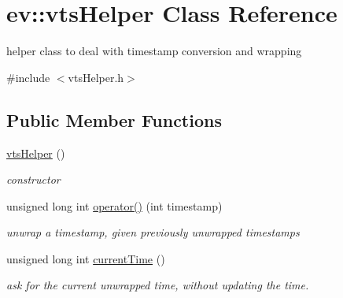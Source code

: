 \hypertarget{classev_1_1vtsHelper}{}\section{ev\+:\+:vts\+Helper Class Reference}
\label{classev_1_1vtsHelper}


helper class to deal with timestamp conversion and wrapping  




{\ttfamily \#include $<$vts\+Helper.\+h$>$}

\subsection*{Public Member Functions}
\begin{DoxyCompactItemize}
\item 
\hyperlink{classev_1_1vtsHelper_a44b5e8174eb7a317001e395bf0d917e8}{vts\+Helper} ()\hypertarget{classev_1_1vtsHelper_a44b5e8174eb7a317001e395bf0d917e8}{}\label{classev_1_1vtsHelper_a44b5e8174eb7a317001e395bf0d917e8}

\begin{DoxyCompactList}\small\item\em constructor \end{DoxyCompactList}\item 
unsigned long int \hyperlink{classev_1_1vtsHelper_a399c3a719f7544209ba77f442c97c135}{operator()} (int timestamp)\hypertarget{classev_1_1vtsHelper_a399c3a719f7544209ba77f442c97c135}{}\label{classev_1_1vtsHelper_a399c3a719f7544209ba77f442c97c135}

\begin{DoxyCompactList}\small\item\em unwrap a timestamp, given previously unwrapped timestamps \end{DoxyCompactList}\item 
unsigned long int \hyperlink{classev_1_1vtsHelper_ab8b7f4f4240f2a0f0279bda5f5f2caff}{current\+Time} ()\hypertarget{classev_1_1vtsHelper_ab8b7f4f4240f2a0f0279bda5f5f2caff}{}\label{classev_1_1vtsHelper_ab8b7f4f4240f2a0f0279bda5f5f2caff}

\begin{DoxyCompactList}\small\item\em ask for the current unwrapped time, without updating the time. \end{DoxyCompactList}\end{DoxyCompactItemize}
